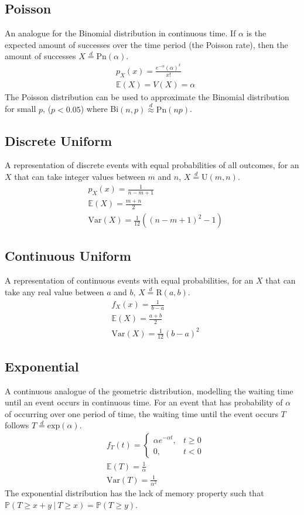 \documentclass[titlepage,twocolumn]{article}
\begin{document}
\subsection*{Poisson}
An analogue for the Binomial distribution in continuous time. If $\alpha$ is the expected amount of successes over the time period (the Poisson rate), then the amount of successes $X\stackrel{d}{=}\mbox{Pn}(\alpha)$.
\begin{align*}
    &p_X(x)=\frac{e^{-\alpha}(\alpha)^x}{x!}\\
    &\mathbb{E}(X)=V(X)=\alpha
\end{align*}
The Poisson distribution can be used to approximate the Binomial distribution for small $p$, ($p < 0.05$) where Bi$(n,p) \stackrel{d}{\approx}\mbox{Pn}(np)$.

\subsection*{Discrete Uniform}
A representation of discrete events with equal probabilities of all outcomes, for an $X$ that can take integer values between $m$ and $n$, $X\stackrel{d}{=}\mbox{U}(m,n)$.
\begin{align*}
    &p_X(x)=\frac{1}{n-m+1}\\
    &\mathbb{E}(X)=\frac{m+n}{2}\\
    &\mbox{Var}(X)=\frac{1}{12}((n-m+1)^2-1)
\end{align*}

\subsection*{Continuous Uniform}
A representation of continuous events with equal probabilities, for an $X$ that can take any real value between $a$ and $b$, $X\stackrel{d}{=}\mbox{R}(a,b)$.
\begin{align*}
    &f_X(x)=\frac{1}{b-a}\\
    &\mathbb{E}(X)=\frac{a+b}{2}\\
    &\mbox{Var}(X)=\frac{1}{12}(b-a)^2
\end{align*}

\subsection*{Exponential}
A continuous analogue of the geometric distribution, modelling the waiting time until an event occurs in continuous time. For an event that has probability of $\alpha$ of occurring over one period of time, the waiting time until the event occurs $T$ follows $T\stackrel{d}{=}\mbox{exp}(\alpha)$.
\begin{align*}
    &f_T(t)=\begin{cases} \alpha e^{-\alpha t}, & t \geq 0 \\ 0, & t < 0 \end{cases}\\
    &\mathbb{E}(T)=\frac{1}{\alpha}\\
    &\mbox{Var}(T)=\frac{1}{\alpha ^2}
\end{align*}
The exponential distribution has the lack of memory property such that $\mathbb{P}(T \geq x+y\ |\ T \geq x) = \mathbb{P}(T \geq y)$.
\vfill
\end{document}
